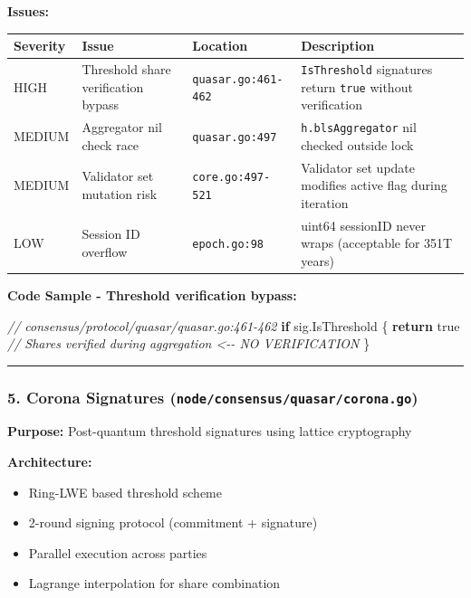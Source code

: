 \documentclass[
]{article}
\newenvironment{Shaded}{}{}
\newcommand{\CommentTok}[1]{\textcolor[rgb]{0.38,0.63,0.69}{\textit{#1}}}
\newcommand{\ControlFlowTok}[1]{\textcolor[rgb]{0.00,0.44,0.13}{\textbf{#1}}}
\newcommand{\NormalTok}[1]{#1}
\newcommand{\OperatorTok}[1]{\textcolor[rgb]{0.40,0.40,0.40}{#1}}
\newcommand{\OtherTok}[1]{\textcolor[rgb]{0.00,0.44,0.13}{#1}}
\newcounter{none} %
\providecommand{\tightlist}{%
  \setlength{\itemsep}{0pt}\setlength{\parskip}{0pt}}
\begin{document}
\textbf{Issues:}

{\def\LTcaptype{none} %
\begin{longtable}[]{@{}llll@{}}
\toprule\noalign{}
Severity & Issue & Location & Description \\
\midrule\noalign{}
\endhead
\bottomrule\noalign{}
\endlastfoot
HIGH & Threshold share verification bypass & \texttt{quasar.go:461-462}
& \texttt{IsThreshold} signatures return \texttt{true} without
verification \\
MEDIUM & Aggregator nil check race & \texttt{quasar.go:497} &
\texttt{h.blsAggregator} nil checked outside lock \\
MEDIUM & Validator set mutation risk & \texttt{core.go:497-521} &
Validator set update modifies active flag during iteration \\
LOW & Session ID overflow & \texttt{epoch.go:98} & uint64 sessionID
never wraps (acceptable for 351T years) \\
\end{longtable}
}

\textbf{Code Sample - Threshold verification bypass:}

\begin{Shaded}
\begin{Highlighting}[]
\CommentTok{// consensus/protocol/quasar/quasar.go:461{-}462}
\ControlFlowTok{if}\NormalTok{ sig}\OperatorTok{.}\NormalTok{IsThreshold }\OperatorTok{\{}
    \ControlFlowTok{return} \OtherTok{true} \CommentTok{// Shares verified during aggregation  \textless{}{-}{-} NO VERIFICATION}
\OperatorTok{\}}
\end{Highlighting}
\end{Shaded}

\begin{center}\rule{0.5\linewidth}{0.5pt}\end{center}

\subsubsection{\texorpdfstring{5. Corona Signatures
(\texttt{node/consensus/quasar/corona.go})}{5. Corona Signatures (node/consensus/quasar/corona.go)}}\label{5-corona-signatures-nodeconsensusquasarcoronago}

\textbf{Purpose:} Post-quantum threshold signatures using lattice
cryptography

\textbf{Architecture:}

\begin{itemize}
\tightlist
\item
  Ring-LWE based threshold scheme
\item
  2-round signing protocol (commitment + signature)
\item
  Parallel execution across parties
\item
  Lagrange interpolation for share combination
\end{itemize}
\end{document}
